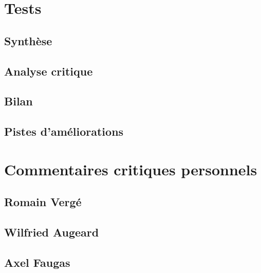 \documentclass[12pt]{report}
\begin{document}
\chapter{Tests}
\section{Synthèse}
\section{Analyse critique}
\section{Bilan}
\section{Pistes d'améliorations}


\chapter{Commentaires critiques personnels}
\section{Romain Vergé}
\section{Wilfried Augeard}
\section{Axel Faugas}
\end{document}
